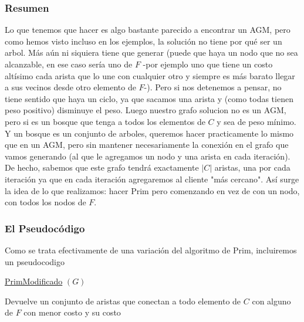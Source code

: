 \documentclass[A4paper,oneside,fleqn,11pt]{article}
\theoremstyle{definition}
\newcommand{\NN}{\mathbb{N}}
\begin{document}
\subsubsection{Resumen}
Lo que tenemos que hacer es algo bastante parecido a encontrar un AGM, pero como hemos visto incluso en los ejemplos, la solución no tiene por qué ser un arbol. Más aún ni siquiera tiene que generar (puede que haya un nodo que no sea alcanzable, en ese caso sería uno de $F$ -por ejemplo uno que tiene un costo altísimo cada arista que lo une con cualquier otro y siempre es más barato llegar a sus vecinos desde otro elemento de $F$-). Pero si nos detenemos a pensar, no tiene sentido que haya un ciclo, ya que sacamos una arista y (como todas tienen peso positivo) disminuye el peso. Luego nuestro grafo solucion no es un AGM, pero si es un bosque que tenga a todos los elementos de $C$ y sea de peso mínimo. Y un bosque es un conjunto de arboles, queremos hacer practicamente lo mismo que en un AGM, pero sin mantener necesariamente la conexión en el grafo que vamos generando (al que le agregamos un nodo y una arista en cada iteración). De hecho, sabemos que este grafo tendrá exactamente $|C|$ aristas, una por cada iteración ya que en cada iteración agregaremos al cliente "más cercano". Así surge la idea de lo que realizamos: hacer Prim pero comenzando en vez de con un nodo, con todos los nodos de $F$.
\subsubsection{El Pseudocódigo}
 Como se trata efectivamente de una variación del algoritmo de Prim, incluiremos un pseudocodigo


\begin{algorithm}[H]

    \underline{PrimModificado} $(G)$\;
    \Output{$costo \in \NN_{0}$, $lista$ vector de aristas}
       
       	\caption{Devuelve un conjunto de aristas que conectan a todo elemento de $C$ con alguno de $F$ con menor costo y su costo} 
\end{algorithm}
\end{document}
